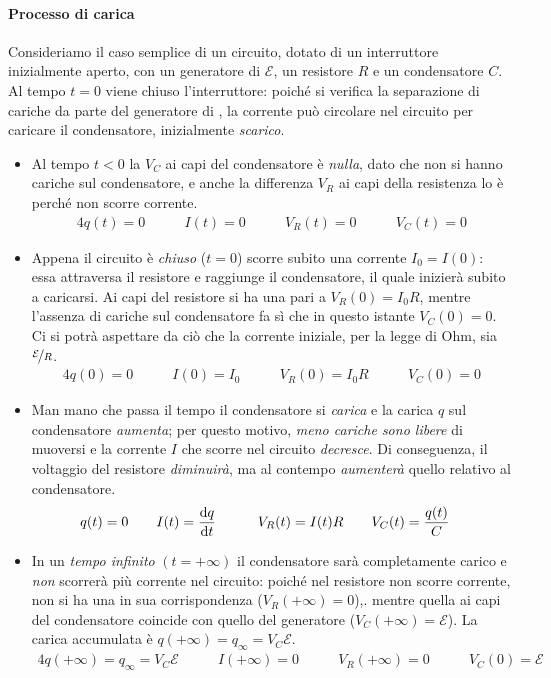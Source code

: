 \paragraph{Processo di carica}
Consideriamo il caso semplice di un circuito, dotato di un interruttore inizialmente aperto, con un generatore di \fem $\mathcal{E}$, un resistore $R$ e un condensatore $C$. Al tempo $t=0$ viene chiuso l'interruttore: poiché si verifica la separazione di cariche da parte del generatore di \fem, la corrente può circolare nel circuito per caricare il condensatore, inizialmente \textit{scarico}.
\begin{itemize}
	\item Al tempo $t<0$ la \ddp $V_C$ ai capi del condensatore è \textit{nulla}, dato che non si hanno cariche sul condensatore, e anche la differenza $V_R$ ai capi della resistenza lo è perché non scorre corrente.
	\begin{alignat*}{4}
		q(t)=0 &\qquad I(t)=0 &\qquad V_R(t)=0 &\qquad V_C(t)=0
	\end{alignat*}
	\item Appena il circuito è \textit{chiuso} ($t=0$) scorre subito una corrente $I_0=I(0)$: essa attraversa il resistore e raggiunge il condensatore, il quale inizierà subito a caricarsi. Ai capi del resistore si ha una \ddp pari a $V_R(0)=I_0R$, mentre l'assenza di cariche sul condensatore fa sì che in questo istante $V_C(0)=0$. Ci si potrà aspettare da ciò che la corrente iniziale, per la legge di Ohm, sia $\nicefrac{\mathcal{E}}{R}$.
	\begin{alignat*}{4}
		q(0)=0 &\qquad I(0)=I_0 &\qquad V_R(0)=I_0R &\qquad V_C(0)=0
	\end{alignat*}
	\item Man mano che passa il tempo il condensatore si \textit{carica} e la carica $q$ sul condensatore \textit{aumenta}; per questo motivo, \textit{meno cariche sono libere} di muoversi e la corrente $I$ che scorre nel circuito \textit{decresce}. Di conseguenza, il voltaggio del resistore \textit{diminuirà}, ma al contempo \textit{aumenterà} quello relativo al condensatore.
	\begin{alignat*}{4}
		q(t)=0 &\qquad I(t)=\dv{q}{t} &\qquad V_R(t)=I(t)R &\qquad V_C(t)=\frac{q(t)}{C}
	\end{alignat*}
	\item In un \textit{tempo infinito} $(t=+\infty)$ il condensatore sarà completamente carico e \textit{non} scorrerà più corrente nel circuito: poiché nel resistore non scorre corrente, non si ha una \ddp in sua corrispondenza ($V_R(+\infty)=0$),. mentre quella ai capi del condensatore coincide con quello del generatore ($V_C(+\infty)=\mathcal{E}$). La carica accumulata è $q(+\infty)=q_{\infty}=V_C\mathcal{E}$.
	\begin{alignat*}{4}
		q(+\infty)=q_{\infty}=V_C\mathcal{E} &\qquad I(+\infty)=0 &\qquad V_R(+\infty)=0 &\qquad V_C(0)=\mathcal{E}
	\end{alignat*}
\end{itemize}
